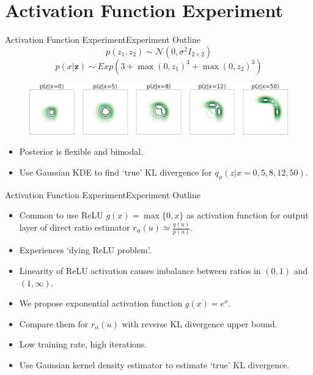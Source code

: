 \documentclass{beamer}
\begin{document}
\section{Activation Function Experiment}
\begin{frame}{Activation Function Experiment}{Experiment Outline}
\[p(z_1,z_2)\sim \mathcal{N} (0,\sigma^2 I_{2\times 2})\]
\[p(x|\bm{z})\sim Exp(3+\max(0,z_1)^3+\max(0,z_2)^3)\]
\begin{figure}[h]
\includegraphics[width=\textwidth]{sprinklertrue.png}
\end{figure}
\begin{itemize}
\item Posterior is flexible and bimodal.
\item Use Gaussian KDE to find `true' KL divergence for $q_\phi(z|x=0,5,8,12,50)$.
\end{itemize}
\end{frame}
\begin{frame}{Activation Function Experiment}{Experiment Outline}
\begin{itemize}
\item Common to use ReLU $g(x)=\max\{0,x\}$ as activation function for output layer of direct ratio estimator $r_\alpha(u)\simeq \frac{q(u)}{p(u)}$.
\item Experiences `dying ReLU problem'.
\item Linearity of ReLU activation causes imbalance between ratios in $(0,1)$ and $(1,\infty)$.
\item We propose exponential activation function $g(x)=e^x$.
\item Compare them for $r_\alpha(u)$ with reverse KL divergence upper bound.
\item Low training rate, high iterations.
\item Use Gaussian kernel density estimator to estimate `true' KL divergence.
\end{itemize}
\end{frame}
\end{document}
